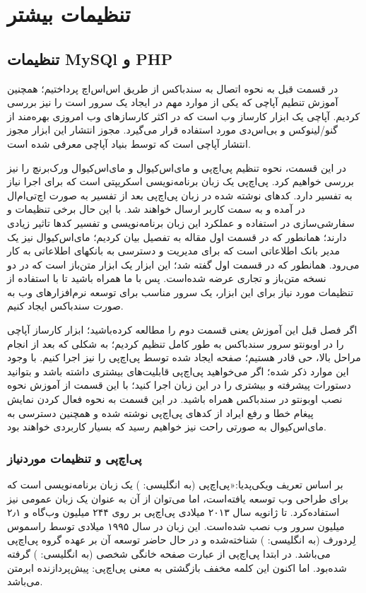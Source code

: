 \part*{تنظیمات بیشتر}
\chapter{تنظیمات MySQl و PHP}

در قسمت قبل به نحوه اتصال به سندباکس از طریق اس‌اس‌اچ پرداختیم؛ همچنین آموزش تنطیم آپاچی که یکی از موارد مهم در ایجاد یک سرور است را نیز بررسی کردیم. آپاچی یک ابزار کارساز وب است که در اکثر کارسازهای وب امروزی بهره‌مند از گنو/لینوکس و بی‌اس‌دی مورد استفاده قرار می‌گیرد. مجوز انتشار این ابزار مجوز انتشار آپاچی است که توسط بنیاد آپاچی معرفی شده است.

در این قسمت، نحوه تنظیم پی‌اچ‌پی و مای‌اس‌کیوال و مای‌اس‌کیوال ورک‌برنچ 
 را  نیز بررسی خواهیم کرد. پی‌اچ‌پی یک زبان برنامه‌نویسی اسکریپتی است که برای اجرا نیاز به تفسیر دارد. کدهای نوشته شده در زبان پی‌اچ‌پی بعد از تفسیر به صورت اچ‌تی‌ام‌ال در آمده و به سمت کاربر ارسال خواهند شد. با این حال برخی تنظیمات و سفارشی‌سازی در استفاده و عملکرد این زبان برنامه‌نویسی و تفسیر کدها تاثیر زیادی دارند؛ همانطور که در قسمت اول مقاله  به تفصیل بیان کردیم؛ مای‌اس‌کیوال نیز یک مدیر بانک اطلاعاتی است که برای مدیریت و دسترسی به بانکهای اطلاعاتی به کار می‌رود.  همانطور که در قسمت اول گفته شد؛ این ابزار یک ابزار متن‌باز است که در دو نسخه متن‌باز و تجاری عرضه شده‌است. پس با ما همراه باشید تا با استفاده از تنظیمات مورد نیاز برای این ابزار، یک سرور مناسب برای توسعه نرم‌افزارهای وب به صورت سند‌باکس ایجاد کنیم.

اگر فصل قبل این آموزش یعنی قسمت دوم را مطالعه کرده‌باشید؛ ابزار کارساز  آپاچی را در اوبونتو  سرور سندباکس به طور کامل تنظیم کردیم؛ به شکلی که بعد از انجام مراحل بالا، حی قادر هستیم؛ صفحه ایجاد شده توسط پی‌اچ‌پی را نیز اجرا کنیم. با وجود این موارد ذکر شده؛  اگر می‌خواهید پی‌اچ‌پی قابلیت‌های بیشتری داشته باشد و بتوانید دستورات پیشرفته و بیشتری را در این زبان اجرا کنید؛ با این قسمت از آموزش نحوه نصب اوبونتو در سندباکس همراه باشید. در این قسمت به نحوه فعال کردن نمایش پیغام خطا و رفع ایراد از کدهای پی‌اچ‌پی نوشته شده و همچنین دسترسی به مای‌اس‌کیوال به صورتی راحت نیز خواهیم رسید که بسیار کاربردی خواهند بود.
\section{پی‌اچ‌پی و تنظیمات مورد‌نیاز}

بر اساس تعریف ویکی‌پدیا:«پی‌اچ‌پی (به انگلیسی: 
) یک زبان برنامه‌نویسی است که برای طراحی وب توسعه یافته‌است، اما می‌توان از آن به عنوان یک زبان عمومی نیز استفاده‌کرد. تا ژانویه سال ۲۰۱۳ میلادی پی‌اچ‌پی بر روی ۲۴۴ میلیون وب‌گاه و ۲٫۱ میلیون سرور وب نصب شده‌است. این زبان در سال ۱۹۹۵ میلادی توسط راسموس لِردورف (به انگلیسی:
 ) شناخته‌شده و در حال حاضر توسعه آن بر عهده گروه پی‌اچ‌پی می‌باشد. در ابتدا پی‌اچ‌پی از عبارت صفحه خانگی شخصی (به انگلیسی:
  ) گرفته شده‌بود. اما اکنون این کلمه مخفف بازگشتی 
  به معنی پی‌اچ‌پی: پیش‌پردازنده ابرمتن می‌باشد.

